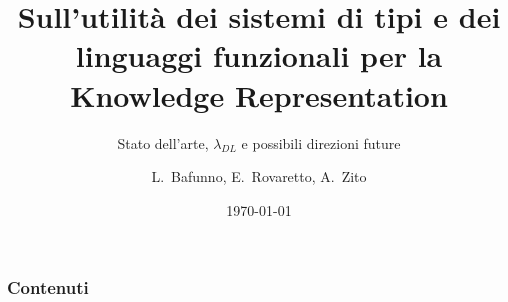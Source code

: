 \documentclass{beamer}
\title[Tipi e Ontologie]{Sull'utilità dei sistemi di tipi e dei linguaggi funzionali per la Knowledge Representation}
\subtitle{Stato dell'arte, $\lambda_{DL}$ e possibili direzioni future}
\author[Bafunno, Rovaretto, Zito]{L.~Bafunno, E.~Rovaretto, A.~Zito}
\institute[UniTo]{Dipartimento di Informatica\\
Università degli Studi di Torino}
\date{\today}
\begin{document}
	\maketitle
	\begin{frame}
		\frametitle{Contenuti}
		\tableofcontents
	\end{frame}
	
	
\end{document}
